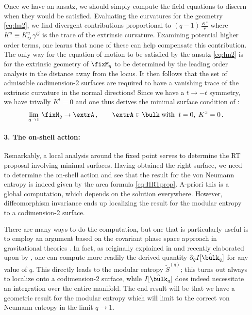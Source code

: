 \documentclass[12pt,openany]{book}
\begin{document}
Once we have an ansatz, we should simply compute the field equations to discern when they would be satisfied.
Evaluating the curvatures for the geometry \eqref{eq:lm2}, we find divergent contributions proportional to  $(q-1)\, \frac{K^a}{r}$ where $K^a \equiv K^a_{ij}\,\gamma^{ij}$ is the trace of the extrinsic curvature. Examining potential higher order terms, one learns that none of these can help compensate this contribution. The only way for the equation of motion to be satisfied by the ansatz \eqref{eq:lm2} is for the extrinsic geometry of $\fixM_q$ to be determined by the leading order analysis in the distance away from the locus.
It then follows that the set of admissible codimension-2 surfaces are required to have a vanishing trace of the extrinsic curvature in the normal directions!
Since we have a $t \rightarrow -t$ symmetry, we have trivally $K^t=0$ and one thus derives the minimal surface condition of \cite{Ryu:2006bv}:
%
\begin{equation}
\lim_{q\to 1} \,\fixM_q  \to \extrA \,, \qquad \extrA \in \bulk \; \text{with}\;\;  t=0, \;K^x =0\,.
\label{eq:lmrt}
\end{equation}
%

\paragraph{3. The on-shell action:}  Remarkably, a local analysis around the fixed point serves to determine the RT proposal involving minimal surfaces. Having obtained the right surface, we need to determine the on-shell action and see that the result for the von Neumann entropy is indeed given by the area formula \eqref{eq:HRTprop}. A-priori  this is a global computation, which depends on the solution everywhere. However,  diffeomorphism invariance ends up localizing the
result for the modular entropy to a codimension-2 surface.

There are many ways to do the computation, but one that is particularly useful is to employ an argument based on the covariant phase space approach in gravitational theories \cite{Iyer:1994ys}. In fact, as originally explained in \cite{Lewkowycz:2013nqa} and recently elaborated upon by \cite{Dong:2016fnf}, one can compute more readily the derived quantity $\partial_q I[\hat{\bulk}_q]$ for any value of $q$.  This directly leads to the modular entropy $\tilde{S}^{(q)}$; this turns out always to  localize  onto a codimension-2 surface, while $I[\hat{\bulk}_q]$ does indeed necessitate an integration over the entire manifold.  The end result will be that we have a geometric result for the modular entropy which will limit to the correct  von Neumann entropy in the limit  $q \to1$.
\end{document}
